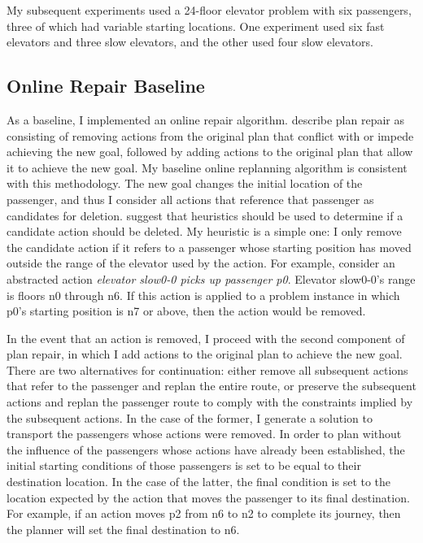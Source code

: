 My subsequent experiments used a 24-floor elevator problem with six passengers, three of which had variable starting locations.  One experiment used six fast elevators and three slow elevators, and the other used four slow elevators.

\subsection{Online Repair Baseline} As a baseline, I implemented an online repair algorithm.  \cite{krogt05planrepair} describe plan repair as consisting of removing actions from the original plan that conflict with or impede achieving the new goal, followed by adding actions to the original plan that allow it to achieve the new goal.  My baseline online replanning algorithm is consistent with this methodology.  The new goal changes the initial location of the passenger, and thus I consider all actions that reference that passenger as candidates for deletion.  \citeauthor{krogt05planrepair} suggest that heuristics should be used to determine if a candidate action should be deleted.  My  heuristic is a simple one: I only remove the candidate action if it refers to a passenger whose starting position has moved outside the range of the elevator used by  the action.  For example, consider an abstracted action \textit{elevator slow0-0 picks up passenger p0}. Elevator slow0-0's range is floors n0 through n6. If this action is applied to a problem instance in which p0's starting position is n7 or above, then the action would be removed.

In the event that an action is removed, I proceed with the second component of plan repair, in which I add actions to the original plan to achieve the new goal.  There are two alternatives for continuation:  either remove all subsequent actions that refer to the passenger and replan the entire route, or preserve the subsequent actions and replan the passenger route to comply with the constraints implied by the subsequent actions.  In the case of the former, I generate a solution to transport the passengers whose actions were removed.  In order to plan without the influence of the passengers whose actions have already been established, the initial starting conditions of those passengers is set to be equal to their destination location.  In the case of the latter, the final condition is set to the location expected by the action that moves the passenger to its final destination.  For example, if an action moves p2 from n6 to n2 to complete its journey, then the planner will set the final destination to n6.


